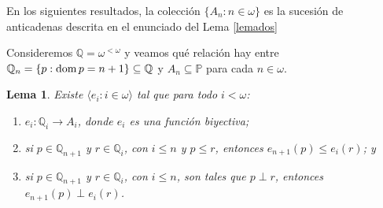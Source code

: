 \documentclass[11pt]{unam_tesis1}
\theoremstyle{MyThmStyle}
\theoremstyle{definition}
\theoremstyle{plain}
\newtheorem{lemma}[definition]{Lema}
\theoremstyle{remark}
\def\dom{\mathop{\rm dom}\nolimits}
\let\leq\leqslant
\begin{document}
En los siguientes resultados, la colecci\'on $\{A_n:n\in\omega\}$ es la sucesi\'on de anticadenas descrita en el enunciado del Lema \ref{lemados} 

Consideremos $\mathbb Q= \omega^{<\omega}$ y veamos qu\'e relaci\'on hay entre $\mathbb Q_n =\{p: \dom p=n+1\}\subseteq \mathbb Q$ y $A_n\subseteq \mathbb P$ para cada $n\in \omega$.

\begin{lemma}\label{biyecciones}
Existe $\langle e_i: i\in \omega \rangle$ tal que para todo $i<\omega$:

\begin{enumerate}

\item $e_i:\mathbb Q_i \rightarrow A_i$, donde $e_i$ es una funci\'on biyectiva;
\item si $p\in \mathbb Q_{n+1}$ y $r\in \mathbb Q_i$, con $i\leq n$ y  $p\leq r$, entonces $e_{n+1}(p)\leq e_i(r)$; y
\item si $p\in \mathbb Q_{n+1}$ y $r\in \mathbb Q_i$, con $i\leq n$, son tales que $p\perp r$, entonces $e_{n+1}(p)\perp e_i(r)$.


\end{enumerate}
\end{lemma}
\end{document}
